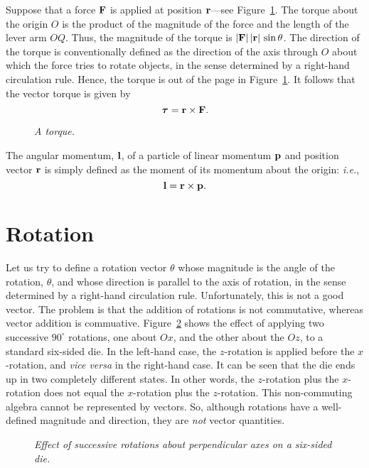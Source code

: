 Suppose that a force ${\bf F}$ is applied at position ${\bf r}$---see Figure~\ref{f8}.
The torque about the origin $O$ is the product of the magnitude of the force and
the length of the lever arm $OQ$. Thus, the magnitude of the torque is
$|{\bf F}|\,|{\bf r}|\,\sin\theta$. The direction of the torque is conventionally defined as the direction of
the axis through $O$ about which the force tries to rotate objects, in the sense
determined by a right-hand circulation rule. Hence, the torque is out of the page in Figure~\ref{f8}.
 It follows that the vector torque is
given by
\begin{equation}
\mbox{\boldmath$\tau$} = {\bf r}\times{\bf F}.
\end{equation}

\begin{figure}
\epsfysize=2.25in
\centerline{}
\caption{\em A torque.}\label{f8}
\end{figure}

The angular momentum, ${\bf l}$, of a particle of linear momentum ${\bf p}$ and position vector ${\bf r}$ is simply defined as the moment of its
momentum about the origin: {\em i.e.}, 
\begin{equation}
{\bf l}={\bf r}\times {\bf p}.
\end{equation}

\section{Rotation}\label{srotn}
Let us try to define a rotation vector \mbox{\boldmath$\theta$} whose magnitude
is the angle of the rotation, $\theta$, and whose direction is parallel to the axis of 
rotation, in the sense determined by a right-hand circulation rule. Unfortunately, this is not a good vector. The problem is that the addition of rotations
is not commutative, whereas vector addition is commuative. 
Figure~\ref{f9} shows the effect of applying two successive $90^\circ$ rotations,
one about $Ox$, and the other about the $Oz$, to a standard six-sided die. In the
left-hand case, the $z$-rotation is applied before the $x$-rotation, and {\em vice
versa} in the right-hand case. It can be seen that the die ends up in two completely
different states. In other words, the $z$-rotation plus the
$x$-rotation does not equal
the  $x$-rotation plus the $z$-rotation. This non-commuting algebra cannot be
represented by vectors. So, although rotations have a well-defined magnitude and
direction, they are {\em not}\/ vector quantities. 
\begin{figure}
\epsfysize=3in
\centerline{}
\caption{\em Effect of successive rotations about perpendicular axes on a six-sided die.}\label{f9}
\end{figure}

